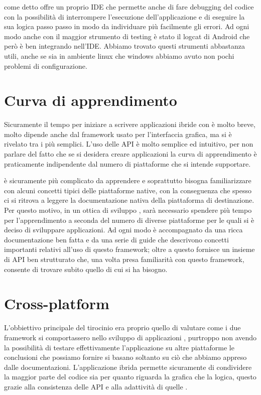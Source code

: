     \tisdk{} come detto offre un proprio IDE che permette anche di fare
    debugging del codice \js{} con la possibilità di interrompere
    l'esecuzione dell'applicazione e di eseguire la sua logica passo passo
    in modo da individuare più facilmente gli errori. Ad ogni modo anche
    con \tisdk{} il maggior strumento di testing è stato il logcat di
    Android che però è ben integrando nell'IDE. Abbiamo trovato
    questi strumenti abbastanza utili, anche se sia in ambiente linux che
    windows abbiamo avuto non pochi problemi di configurazione.


    \section{Curva di apprendimento}
    Sicuramente il tempo per iniziare a scrivere applicazioni ibride con
    \pg{} è molto breve, molto dipende anche dal framework usato per
    l'interfaccia grafica, ma \kendomob{} si è rivelato tra i più semplici.
    L'uso delle API è molto semplice ed intuitivo, per non parlare del
    fatto che se si desidera creare applicazioni \crossplat{} la curva di
    apprendimento è praticamente indipendente dal numero di piattaforme
    che si intende supportare.

    \tisdk{} è sicuramente più complicato da apprendere e soprattutto
    bisogna familiarizzare con alcuni concetti tipici delle piattaforme
    native, con la conseguenza che spesso ci si ritrova a leggere la
    documentazione nativa della piattaforma di destinazione. Per
    questo motivo, in un ottica di sviluppo \crossplat{}, sarà necessario
    spendere più tempo per l'apprendimento a seconda del numero di diverse
    piattaforme per le quali si è deciso di sviluppare applicazioni. Ad
    ogni modo \tisdk{} è accompagnato da una ricca documentazione ben
    fatta e da una serie di guide che descrivono concetti
    importanti relativi all'uso di questo framework; oltre a questo
    \tisdk{} fornisce un insieme di API ben strutturato che, una volta
    presa familiarità con questo framework, consente di trovare subito
    quello di cui si ha bisogno.


    \section{Cross-platform}
    L'obbiettivo principale del tirocinio era proprio quello di valutare
    come i due framework si comportassero nello sviluppo di applicazioni
    \crossplat{}, purtroppo non avendo la possibilità di testare
    effettivamente l'applicazione su altre piattaforme le conclusioni che
    possiamo fornire si basano soltanto su ciò che abbiamo appreso dalle
    documentazioni. L'applicazione ibrida permette sicuramente di
    condividere la maggior parte del codice sia per quanto riguarda la
    grafica che la logica, questo grazie alla consistenza delle API \pg{}
    e alla adattività di quelle \kendomob{}.

